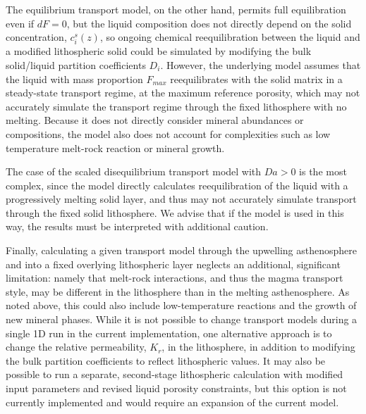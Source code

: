 \documentclass[draft]{agujournal2019}
\begin{document}
The equilibrium transport model, on the other hand, permits full equilibration even if $dF=0$, but the liquid composition does not directly depend on the solid concentration, $c_i^s(z)$, so ongoing chemical reequilibration between the liquid and a modified lithospheric solid could be simulated by modifying the bulk solid/liquid partition coefficients $D_i$. However, the underlying model assumes that the liquid with mass proportion $F_{max}$ reequilibrates with the solid matrix in a steady-state transport regime, at the maximum reference porosity, which may not accurately simulate the transport regime through the fixed lithosphere with no melting. Because it does not directly consider mineral abundances or compositions, the model also does not account for complexities such as low temperature melt-rock reaction or mineral growth.

The case of the scaled disequilibrium transport model with $Da>0$ is the most complex, since the model directly calculates reequilibration of the liquid with a progressively melting solid layer, and thus may not accurately simulate transport through the fixed solid lithosphere. We advise that if the model is used in this way, the results must be interpreted with additional caution.

Finally, calculating a given transport model through the upwelling asthenosphere and into a fixed overlying lithospheric layer neglects an additional, significant limitation: namely that melt-rock interactions, and thus the magma transport style, may be different in the lithosphere than in the melting asthenosphere. As noted above, this could also include low-temperature reactions and the growth of new mineral phases. While it is not possible to change transport models during a single 1D run in the current implementation, one alternative approach is to change the relative permeability, $K_r$, in the lithosphere, in addition to modifying the bulk partition coefficients to reflect lithospheric values. It may also be possible to run a separate, second-stage lithospheric calculation with modified input parameters and revised liquid porosity constraints, but this option is not currently implemented and would require an expansion of the current model.
\end{document}
